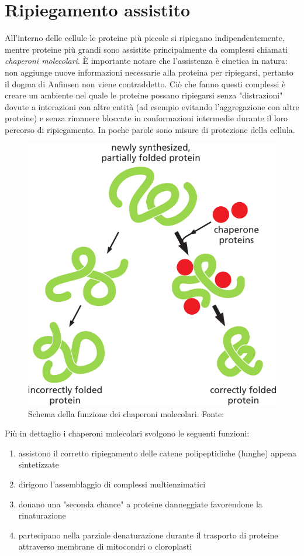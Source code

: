 \section{Ripiegamento assistito}
All'interno delle cellule le proteine più piccole si ripiegano indipendentemente, mentre proteine più grandi sono assistite principalmente da complessi chiamati \textit{chaperoni molecolari}. È  importante notare che l'assistenza è cinetica in natura: non aggiunge nuove informazioni necessarie alla proteina per ripiegarsi, pertanto il dogma di Anfinsen non viene contraddetto. Ciò che fanno questi complessi è creare un ambiente nel quale le proteine possano ripiegarsi senza "distrazioni" dovute a interazioni con altre entità (ad esempio evitando l'aggregazione con altre proteine) e senza rimanere bloccate in conformazioni intermedie durante il loro percorso di ripiegamento. In poche parole sono misure di protezione della cellula. 

\begin{figure}[h]
	\centering
	\includegraphics[scale=0.4]{images/chaperone-alberts.png}
	\caption{Schema della funzione dei chaperoni molecolari. Fonte: \cite{alberts2018essential}}
	\label{fig:chaperoni}
\end{figure}

Più in dettaglio i chaperoni molecolari svolgono le seguenti funzioni:
\begin{enumerate}
	\item assistono il corretto ripiegamento delle catene polipeptidiche (lunghe) appena sintetizzate
	\item dirigono l'assemblaggio di complessi multienzimatici
	\item donano una "seconda chance" a proteine danneggiate favorendone la rinaturazione
	\item partecipano nella parziale denaturazione durante il trasporto di proteine attraverso membrane di mitocondri o cloroplasti
\end{enumerate}

